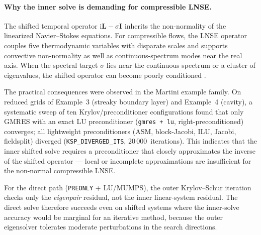\documentclass[11pt]{article}
\newcommand{\bI}{\mathbf{I}}
\newcommand{\bL}{\mathbf{L}}
\begin{document}
\paragraph{Why the inner solve is demanding for compressible LNSE.}
The shifted temporal operator $\mathrm{i}\bL - \sigma\bI$ inherits the
non-normality of the linearized Navier--Stokes equations. For compressible
flows, the LNSE operator couples five thermodynamic variables with disparate
scales and supports convective non-normality
\citep{trefethen1993hydrodynamic,schmid2007nonmodal} as well as
continuous-spectrum modes near the real axis. When the spectral target
$\sigma$ lies near the continuous spectrum or a cluster of eigenvalues, the
shifted operator can become poorly conditioned
\citep{trefethen2005spectra,saad2003iterative}.

The practical consequences were observed in the Martini example family.
On reduced grids of Example~3 (streaky boundary layer) and Example~4
(cavity), a systematic sweep of ten Krylov/preconditioner configurations
found that only GMRES with an exact LU preconditioner (\texttt{gmres +
lu}, right-preconditioned) converges; all lightweight preconditioners (ASM,
block-Jacobi, ILU, Jacobi, fieldsplit) diverged
(\texttt{KSP\_DIVERGED\_ITS}, 20\,000~iterations). This indicates that the
inner shifted solve requires a preconditioner that closely approximates the
inverse of the shifted operator --- local or incomplete approximations are
insufficient for the non-normal compressible LNSE.

For the direct path (\texttt{PREONLY} + LU/MUMPS), the outer Krylov--Schur
iteration checks only the \emph{eigenpair} residual, not the inner
linear-system residual. The direct solve therefore succeeds even on shifted
systems where the inner-solve accuracy would be marginal for an iterative
method, because the outer eigensolver tolerates moderate perturbations in
the search directions.
\end{document}
